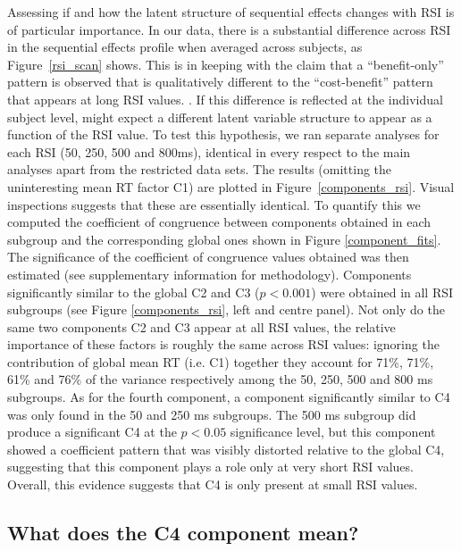 \documentclass{apa}[12pt]
\begin{document}
Assessing if and how the latent structure of sequential effects changes with RSI is of particular importance. In our data, there is a substantial difference across RSI in the sequential effects profile when averaged across subjects, as Figure~\ref{rsi_scan} shows. This is in keeping with the claim that  a ``benefit-only'' pattern is observed that is qualitatively different to the ``cost-benefit'' pattern that appears at long RSI values. \cite{Soetens85}. If this difference is reflected at the individual subject level, might expect a different latent variable structure to appear as a function of the RSI value. To test this hypothesis, we ran separate analyses for each RSI (50, 250, 500 and 800ms), identical in every respect to the main analyses apart from the restricted data sets. The results (omitting the uninteresting mean RT factor C1) are plotted in Figure~\ref{components_rsi}. Visual inspections suggests that these are essentially identical. To quantify this we computed the coefficient of congruence \cite{Gorsuch83} between components obtained in each subgroup and the corresponding global ones shown in Figure \ref{component_fits}. The significance of the coefficient of congruence values obtained was then estimated (see supplementary information for methodology). Components significantly similar to the global C2 and C3 ($p < 0.001$) were obtained in all RSI subgroups (see Figure \ref{components_rsi}, left and centre panel). Not only do the same two components C2 and C3 appear at all RSI values, the relative importance of these factors is roughly the same across RSI values: ignoring the contribution of global mean RT (i.e. C1) together they account for 71\%, 71\%, 61\% and 76\% of the variance respectively among the 50, 250, 500 and 800 ms subgroups. As for the fourth component, a component significantly similar to C4 was only found in the 50 and 250 ms subgroups. The 500 ms subgroup did produce a significant C4 at the $p < 0.05$ significance level, but this component showed a coefficient pattern that was visibly distorted relative to the global C4, suggesting that this component plays a role only at very short RSI values. Overall, this evidence suggests that C4 is only present at small RSI values.


\subsection{What does the C4 component mean?}
\end{document}
